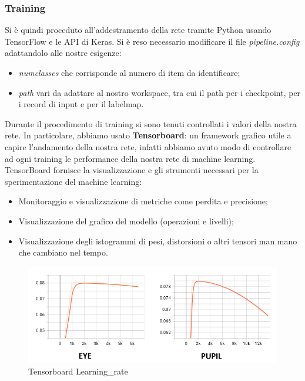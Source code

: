\documentclass[11pt]{article}
\begin{document}
\subsubsection{Training}
Si è quindi proceduto all’addestramento della rete tramite Python usando TensorFlow e le API di Keras. Si è reso necessario modificare il file \textit{pipeline.config} adattandolo alle nostre esigenze: 
\begin{itemize}
    \item \textit{numclasses} che corrisponde al numero di item da identificare;
    \item \textit{path} vari da adattare al nostro workspace, tra cui il path per i checkpoint, per i record di input e per il labelmap.
\end{itemize}
\newline
Durante il procedimento di training si sono tenuti controllati i valori della nostra rete. In particolare, abbiamo usato \textbf{Tensorboard}: un framework grafico utile a capire l'andamento della nostra rete, infatti abbiamo avuto modo di controllare ad ogni training le performance della nostra rete di machine learning.
\newline
TensorBoard fornisce la visualizzazione e gli strumenti necessari per la sperimentazione del machine learning:
\begin{itemize}
    \item Monitoraggio e visualizzazione di metriche come perdita e precisione;
    \item Visualizzazione del grafico del modello (operazioni e livelli);
    \item Visualizzazione degli istogrammi di pesi, distorsioni o altri tensori man mano che cambiano nel tempo.
\end{itemize}


\begin{figure}[h]
\caption{Tensorboard Learning\_rate}
\centering
\includegraphics[scale=0.7]{img/learning_rate_both_edited.png}
\end{figure}
\end{document}
